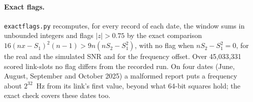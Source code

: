 \documentclass[11pt]{article}
\begin{document}
\begin{appendices}
\paragraph{Exact flags.} \texttt{exactflags.py} recomputes, for every record of each date, the window sums in unbounded integers and flags $|z|>0.75$ by the exact comparison $16(nx-S_1)^2(n-1)>9n(nS_2-S_1^2)$, with no flag when $nS_2-S_1^2=0$, for the real and the simulated SNR and for the frequency offset. Over 45{,}033{,}331 scored link-slots no flag differs from the recorded run. On four dates (June, August, September and October 2025) a malformed report puts a frequency about $2^{32}$~Hz from its link's first value, beyond what 64-bit squares hold; the exact check covers these dates too.

\end{appendices}
\end{document}
